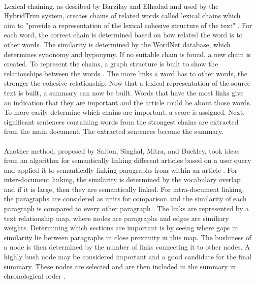 \documentclass[11pt,titlepage]{report}
\begin{document}
\paragraph{}
Lexical chaining, as desribed by Barzilay and Elhadad and used by the HybridTrim system, creates chains of related words called lexical chains which aim to "provide a representation of the lexical cohesive structure of the text" \cite{lexical_chains}. For each word, the correct chain is determined based on how related the word is to other words. The similarity is determined by the WordNet database, which determines synonomy and hyponymy. If no suitable chain is found, a new chain is created. To represent the chains, a graph structure is built to show the relationships between the words \cite{lexical_chains}. The more links a word has to other words, the stronger the cohesive relationship. Now that a lexical representation of the source text is built, a summary can now be built. Words that have the most links give an indication that they are important and the article could be about those words. To more easily determine which chains are important, a score is assigned. Next, significant sentences containing words from the strongest chains are extracted from the main document. The extracted sentences become the summary.
\paragraph{}
Another method, proposed by Salton, Singhal, Mitra, and Buckley, took ideas from an algorithm for semantically linking different articles based on a user query and applied it to semantically linking paragraphs from within an article \cite{automatic}. For inter-document linking, the similarity is determined by the vocabulary overlap and if it is large, then they are semantically linked. For intra-document linking, the paragraphs are considered as units for comparison and the similarity of each paragraph is compared to every other paragraph \cite{automatic}. The links are represented by a text relationship map, where nodes are paragraphs and edges are similiary weights. Determining which sections are important is by seeing where gaps in similarity lie between paragraphs in close proximity in this map. The bushiness of a node is then determined by the number of links connecting it to other nodes. A highly bush node may be considered important and a good candidate for the final summary. These nodes are selected and are then included in the summary in chronological order \cite{automatic}. 
\end{document}
